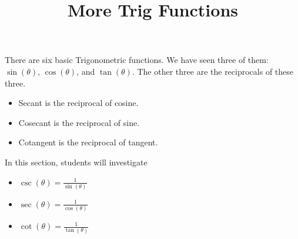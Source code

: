 \documentclass{ximera}
\title{More Trig Functions}
\begin{document}
\begin{abstract}
%
\end{abstract}
\maketitle



There are six basic Trigonometric functions.  We have seen three of them: $\sin(\theta)$, $\cos(\theta)$, and $\tan(\theta)$. The other three are the reciprocals of these three.


\begin{itemize}
\item Secant is the reciprocal of cosine.
\item Cosecant is the reciprocal of sine.
\item Cotangent is the reciprocal of tangent.
\end{itemize}







\begin{sectionOutcomes}
In this section, students will investigate

\begin{itemize}
\item $\csc(\theta) = \frac{1}{\sin(\theta)}$
\item $\sec(\theta) = \frac{1}{\cos(\theta)}$
\item $\cot(\theta) = \frac{1}{\tan(\theta)}$
\end{itemize}
\end{sectionOutcomes}
\end{document}
